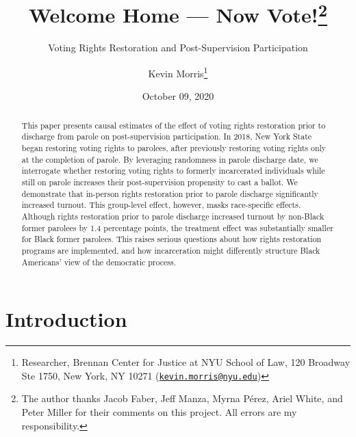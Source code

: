 \documentclass[
  12pt,
]{article}
\title{Welcome Home --- Now Vote!\thanks{The author thanks Jacob Faber, Jeff Manza, Myrna Pérez, Ariel White, and Peter Miller for their comments on this project. All errors are my responsibility.}}
\subtitle{Voting Rights Restoration and Post-Supervision Participation}
\author{Kevin Morris\footnote{Researcher, Brennan Center for Justice at NYU School of Law, 120 Broadway Ste 1750, New York, NY 10271 (\href{mailto:kevin.morris@nyu.edu}{\nolinkurl{kevin.morris@nyu.edu}})}}
\date{October 09, 2020}
\begin{document}
\maketitle
\begin{abstract}
This paper presents causal estimates of the effect of voting rights restoration prior to discharge from parole on post-supervision participation. In 2018, New York State began restoring voting rights to parolees, after previously restoring voting rights only at the completion of parole. By leveraging randomness in parole discharge date, we interrogate whether restoring voting rights to formerly incarcerated individuals while still on parole increases their post-supervision propensity to cast a ballot. We demonstrate that in-person rights restoration prior to parole discharge significantly increased turnout. This group-level effect, however, masks race-specific effects. Although rights restoration prior to parole discharge increased turnout by non-Black former parolees by 1.4 percentage points, the treatment effect was substantially smaller for Black former parolees. This raises serious questions about how rights restoration programs are implemented, and how incarceration might differently structure Black Americans' view of the democratic process.
\end{abstract}

\pagebreak
\doublespacing


\hypertarget{introduction}{%
\section*{Introduction}\label{introduction}}
\end{document}
